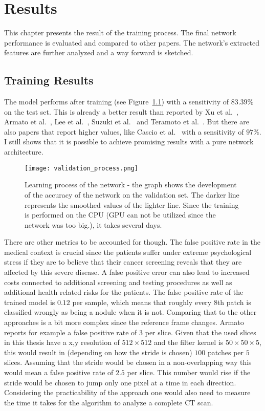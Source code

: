 \documentclass[main.tex]{subfiles}
\begin{document}
\chapter{Results}\label{chap:results}
This chapter presents the result of the training process. The final network performance is evaluated and compared to other papers. The network's extracted features are further analyzed and a way forward is sketched.

\section{Training Results}
The model performs after training (see Figure~\ref{fig:validation}) with a sensitivity of $83.39\%$ on the test set. This is already a better result than reported by Xu et al.~\cite{xu1997development}, Armato et al.~\cite{armato1999computerized}, Lee et al.~\cite{lee2001automated}, Suzuki et al.~\cite{suzuki2003massive} and Teramoto et al.~\cite{teramoto2013fast}. But there are also papers that report higher values, like Cascio et al.~\cite{cascio2012automatic} with a sensitivity of $97\%$. I still shows that it is possible to achieve promising results with a pure network architecture.

\begin{figure}
\begin{center}
\texttt{[image: validation\_process.png]}
\end{center}
\caption{Learning process of the network - the graph shows the development of the accuracy of the network on the validation set. The darker line represents the smoothed values of the lighter line. Since the training is performed on the CPU (GPU can not be utilized since the network was too big.), it takes several days.}
\label{fig:validation}
\end{figure}

There are other metrics to be accounted for though. The false positive rate in the medical context is crucial since the patients suffer under extreme psychological stress if they are to believe that their cancer screening reveals that they are affected by this severe disease. A false positive error can also lead to increased costs connected to additional screening and testing procedures as well as additional health related risks for the patients. The false positive rate of the trained model is $0.12$ per sample, which means that roughly every 8th patch is classified wrongly as being a nodule when it is not. Comparing that to the other approaches is a bit more complex since the reference frame changes. Armato~\cite{armato1999computerized} reports for example a false positive rate of 3 per slice. Given that the used slices in this thesis have a x,y resolution of $512 \times 512$ and the filter kernel is $50 \times 50 \times 5$, this would result in (depending on how the stride is chosen) $100$ patches per $5$ slices. Assuming that the stride would be chosen in a non-overlapping way this would mean a false positive rate of $2.5$ per slice. This number would rise if the stride would be chosen to jump only one pixel at a time in each direction.  
Considering the practicability of the approach one would also need to measure the time it takes for the algorithm to analyze a complete CT scan.
\end{document}
